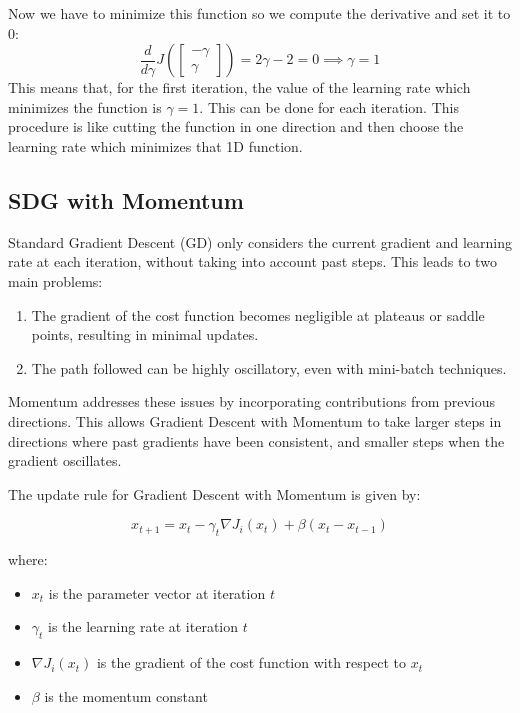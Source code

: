 Now we have to minimize this function so we compute the derivative and set it to 0:
\[
    \dfrac{d}{d\gamma} J\left(  
        \begin{bmatrix}
            -\gamma\\
            \gamma
        \end{bmatrix}
        \right) = 2\gamma - 2 = 0 \implies \gamma = 1
\]
This means that, for the first iteration, the value of the learning rate which minimizes the function is $\gamma = 1$. This can be done for each iteration. 
This procedure is like cutting the function in one direction and then choose the learning rate which minimizes that 1D function. 


\subsection*{SDG with Momentum}




Standard Gradient Descent (GD) only considers the current gradient and learning rate at each iteration, without taking into account past steps. This leads to two main problems:

\begin{enumerate}
    \item The gradient of the cost function becomes negligible at plateaus or saddle points, resulting in minimal updates.
    \item The path followed can be highly oscillatory, even with mini-batch techniques.
\end{enumerate}

Momentum addresses these issues by incorporating contributions from previous directions. This allows Gradient Descent with Momentum to take larger steps in directions where past gradients have been consistent, and smaller steps when the gradient oscillates.

The update rule for Gradient Descent with Momentum is given by:

\begin{equation}
    x_{t+1} = x_t - \gamma_t \nabla J_i(x_t) + \beta(x_t - x_{t-1})
\end{equation}

where:
\begin{itemize}
    \item $x_t$ is the parameter vector at iteration $t$
    \item $\gamma_t$ is the learning rate at iteration $t$
    \item $\nabla J_i(x_t)$ is the gradient of the cost function with respect to $x_t$
    \item $\beta$ is the momentum constant
\end{itemize}

